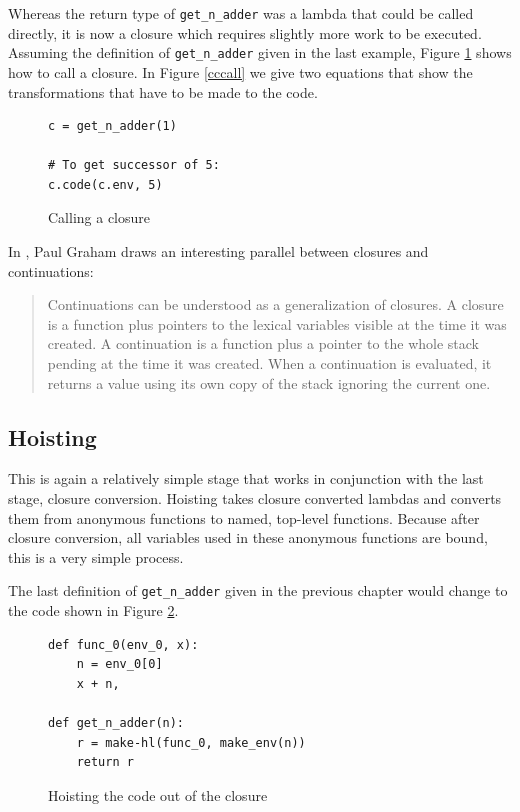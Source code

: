 \documentclass[11pt]{report}
\begin{document}
Whereas the return type of \texttt{get_n_adder} was a lambda that could be called directly, it is now a closure which requires slightly more work to be executed. Assuming the definition of \texttt{get_n_adder} given in the last example, Figure \ref{cc7} shows how to call a closure. In Figure \ref{cccall} we give two equations that show the transformations that have to be made to the code.

\begin{figure}[ht]
\begin{lstlisting}
c = get_n_adder(1)

# To get successor of 5:
c.code(c.env, 5)
\end{lstlisting}
\caption{Calling a closure}
\label{cc7}
\end{figure}

In \cite{onlisp}, Paul Graham draws an interesting parallel between closures and continuations:
\begin{quote}
Continuations can be understood as a generalization of closures. A closure is a function plus pointers to the lexical variables visible at the time it was created. A continuation is a function plus a pointer to the whole stack pending at the time it was created. When a continuation is evaluated, it returns a value using its own copy of the stack ignoring the current one.
\end{quote}



\subsection{Hoisting}
This is again a relatively simple stage that works in conjunction with the last stage, closure conversion. Hoisting takes closure converted lambdas and converts them from anonymous functions to named, top-level functions. Because after closure conversion, all variables used in these anonymous functions are bound, this is a very simple process.

The last definition of \texttt{get_n_adder} given in the previous chapter would change to the code shown in Figure \ref{hoisting}.

\begin{figure}[ht]
\begin{lstlisting}
def func_0(env_0, x):
    n = env_0[0]
    x + n, 
    
def get_n_adder(n):
    r = make-hl(func_0, make_env(n))
    return r
\end{lstlisting}
\caption{Hoisting the code out of the closure}
\label{hoisting}
\end{figure}
\end{document}
